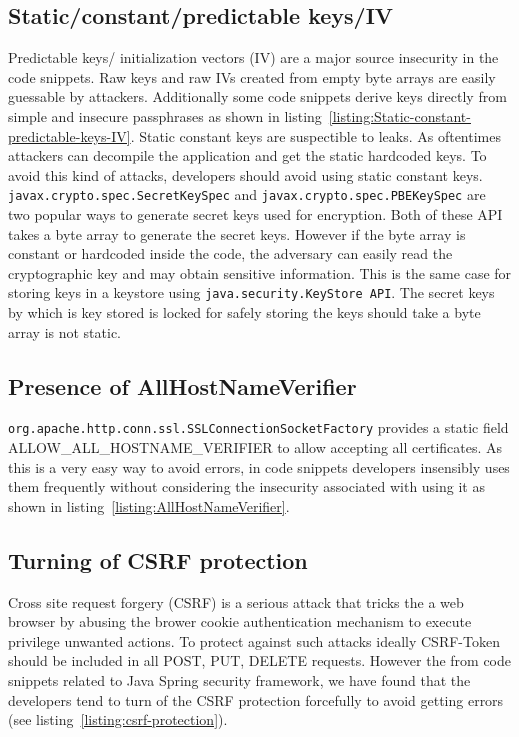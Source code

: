 \subsection{Static/constant/predictable keys/IV }
Predictable keys/ initialization vectors (IV) are a major source insecurity in the code snippets. 
Raw keys and raw IVs created from empty byte arrays
are easily guessable by attackers. 
Additionally some code snippets derive keys directly from simple and insecure passphrases as shown in listing~\ref{listing:Static-constant-predictable-keys-IV}. 
Static constant keys are suspectible to leaks. As oftentimes attackers can decompile the application and get the static hardcoded keys.  To avoid this kind of attacks, developers should avoid using static constant keys. \texttt{javax.crypto.spec.SecretKeySpec} and \texttt{javax.crypto.spec.\-PBEKeySpec} are two popular ways to generate secret keys used for encryption. Both of these API takes a byte array to generate the secret keys. However if the byte array is constant or hardcoded inside the code, the adversary can easily read the cryptographic key and may obtain sensitive information. This is the same case for storing keys in a keystore using \texttt{java.security.KeyStore API}. The secret keys by which is key stored is locked for safely storing the keys should take a byte array is not static.


\subsection{Presence of AllHostNameVerifier}
\texttt{org.apache.http.conn.ssl.SSLConnectionSocketFactory} provides  a static field ALLOW\_ALL\_HOSTNAME\_VERIFIER to allow accepting all certificates.  
As this is a very easy way to avoid errors, in code snippets developers insensibly uses them frequently without considering the insecurity associated with using it as shown in listing~\ref{listing:AllHostNameVerifier}.

\subsection{Turning of CSRF protection}
Cross site request forgery (CSRF) is a serious attack that tricks the a web browser by abusing the brower cookie authentication mechanism to execute privilege unwanted actions. To protect against such attacks ideally CSRF-Token should be included in all POST, PUT, DELETE requests.
However the from code snippets related to Java Spring security framework, we have found that the developers tend to turn of the CSRF protection forcefully to avoid getting errors (see listing~\ref{listing:csrf-protection}). 